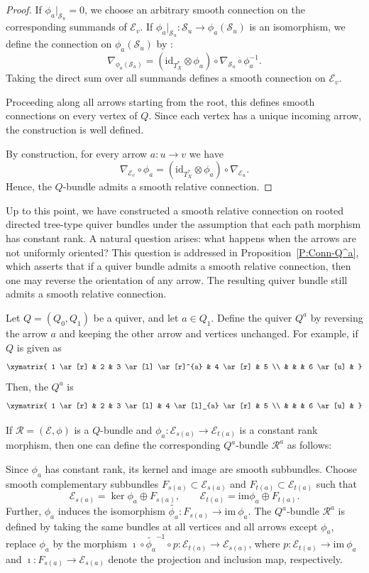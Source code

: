 \documentclass[12pt, reqno]{amsart}
\theoremstyle{plain}
\numberwithin{equation}{section}
\newcommand{\im}{\mathrm{im}}
\begin{document}
\begin{proof}
If $\phi_a|_{\mathcal{S}_u} = 0$, we choose an arbitrary smooth
connection on the corresponding summands of $\mathcal{E}_v$. If $\phi_a|_{\mathcal{S}_u}
:
\mathcal{S}_u
\longrightarrow
\phi_a(\mathcal{S}_u)$ is an isomorphism, we define the connection on
$\phi_a(\mathcal{S}_u)$ by :
\[
\nabla_{\phi_a(\mathcal{S}_u)}
=
(\mathrm{id}_{T_X^*}\otimes \phi_a) \circ \nabla_{\mathcal{S}_u} \circ \phi_a^{-1}.
\]
Taking the direct sum over all summands defines a smooth
connection on $\mathcal{E}_v$.

Proceeding along all arrows starting from the root,
this defines smooth connections on every vertex of $Q$.
Since each vertex has a unique incoming arrow,
the construction is well defined.

By construction, for every arrow $a : u \to v$ we have
\[
\nabla_{\mathcal{E}_v} \circ \phi_a
=
(\mathrm{id}_{T^*_X} \otimes \phi_a)
\circ
\nabla_{\mathcal{E}_u}.
\]
Hence, the $Q$-bundle admits a smooth relative connection.
\end{proof}

Up to this point, we have constructed a smooth relative connection on rooted directed tree-type quiver bundles under the assumption that each path morphism has constant rank. A natural question arises: what happens when the arrows are not uniformly oriented? This question is addressed in Proposition~\ref{P:Conn-Q^a}, which asserts that if a quiver bundle admits a smooth relative connection, then one may reverse the orientation of any arrow. The resulting quiver bundle still admits a smooth relative connection.



Let $Q=(Q_0, Q_1)$ be a quiver, and let $a\in Q_1$. Define the quiver $Q^a$ by reversing the arrow $a$ and keeping the other arrow and vertices unchanged. For example, if $Q$ is given as 
\[
\xymatrix{
1 \ar[r]  & 2  & 3 \ar[l] \ar[r]^{a} & 4 \ar[r] & 5  \\
& & &  6 \ar[u] & }
\]
Then, the $Q^a$ is 
\[
\xymatrix{
1 \ar[r]  & 2  & 3 \ar[l]  & 4 \ar[l]_{a} \ar[r] & 5  \\
& & &  6 \ar[u] & }
\]

If $\mathcal{R}=(\mathcal{E},\phi)$ is a $Q$-bundle and $\phi_a:\mathcal{E}_{s(a)} \rightarrow \mathcal{E}_{t(a)}$ is a constant rank morphism, then one can define the corresponding $Q^a$-bundle $\mathcal{R}^a$ as follows: 

Since $\phi_a$ has constant rank, its kernel and image are smooth subbundles. 
Choose smooth complementary subbundles 
$F_{s(a)} \subset \mathcal{E}_{s(a)}$ and 
$F_{t(a)} \subset \mathcal{E}_{t(a)}$ such that
\[
\mathcal{E}_{s(a)} = \ker\phi_a \oplus F_{s(a)},
\qquad
\mathcal{E}_{t(a)} = \im\phi_a \oplus F_{t(a)}.
\]
 Further, $\phi_a$ induces the isomorphism $\tilde{\phi_a}:  F_{s(a)}\rightarrow \im~\phi_a$. The $Q^a$-bundle $\mathcal{R}^a$ is defined by taking the same bundles at all vertices and all arrows except $\phi_a$, replace $\phi_a$ by the morphism $\imath \circ \tilde{\phi_a}^{-1} \circ p: \mathcal{E}_{t(a)} \rightarrow \mathcal{E}_{s(a)}$, where $p: \mathcal{E}_{t(a)} \rightarrow \im~\phi_a$ and $\imath:  F_{s(a)} \rightarrow \mathcal{E}_{s(a)}$ denote the projection and inclusion map, respectively. 
\end{document}
